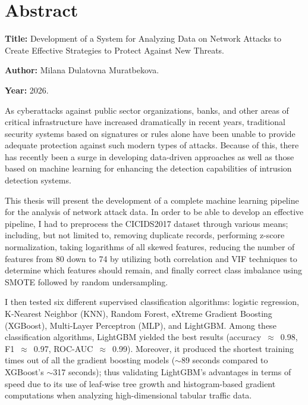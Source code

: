 \chapter{Abstract}

\begin{SingleSpace}

\noindent \textbf{Title:} Development of a System for Analyzing Data on Network Attacks to Create Effective Strategies to Protect Against New Threats.

\noindent \textbf{Author:} Milana Dulatovna Muratbekova.

\noindent \textbf{Year:} 2026.

\vspace{0.8em}
As cyberattacks against public sector organizations, banks, and other areas of critical infrastructure have increased dramatically in recent years, traditional security systems based on signatures or rules alone have been unable to provide adequate protection against such modern types of attacks. Because of this, there has recently been a surge in developing data-driven approaches as well as those based on machine learning for enhancing the detection capabilities of intrusion detection systems.

This thesis will present the development of a complete machine learning pipeline for the analysis of network attack data. In order to be able to develop an effective pipeline, I had to preprocess the CICIDS2017 dataset through various means; including, but not limited to, removing duplicate records, performing z-score normalization, taking logarithms of all skewed features, reducing the number of features from 80 down to 74 by utilizing both correlation and VIF techniques to determine which features should remain, and finally correct class imbalance using SMOTE followed by random undersampling.

I then tested six different supervised classification algorithms: logistic regression, K-Nearest Neighbor (KNN), Random Forest, eXtreme Gradient Boosting (XGBoost), Multi-Layer Perceptron (MLP), and LightGBM. Among these classification algorithms, LightGBM yielded the best results (accuracy~$\approx$~0.98, F1~$\approx$~0.97, ROC-AUC~$\approx$~0.99). Moreover, it produced the shortest training times out of all the gradient boosting models ($\sim$89 seconds compared to XGBoost's $\sim$317 seconds); thus validating LightGBM's advantages in terms of speed due to its use of leaf-wise tree growth and histogram-based gradient computations when analyzing high-dimensional tabular traffic data.


\end{SingleSpace}
